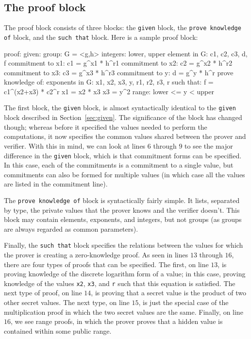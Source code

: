 \documentclass[letterpaper,11pt]{article}
\begin{document}
\subsection{The proof block}\label{sec:proof}

The proof block consists of three blocks: the \verb#given# block, the 
\verb#prove knowledge of# block, and the \verb#such that# block.  Here is a
sample proof block:

\begin{ZKPVerbatim}
proof:
	given: 
		group: G = <g,h>
		integers: lower, upper
		element in G: c1, c2, c3, d, f
			commitment to x1: c1 = g^x1 * h^r1
			commitment to x2: c2 = g^x2 * h^r2
			commitment to x3: c3 = g^x3 * h^r3
			commitment to y: d = g^y * h^r
	prove knowledge of:
		exponents in G: x1, x2, x3, y, r1, r2, r3, r
	such that:
		f = c1^(x2+x3) * c2^r
		x1 = x2 * x3
		x3 = y^2
		range: lower <= y < upper
\end{ZKPVerbatim}  

The first block, the \verb#given# 
block, is almost syntactically identical to the \verb#given# block described in
Section~\ref{sec:given}.  The significance of the block has changed though;
whereas before it specified the values needed to perform the computations, it now
specifies the common values shared between the prover and verifier.  With this
in mind, we can look at lines $6$ through $9$ to see the major difference in
the \verb#given# block, which is that commitment forms can be specified.  In
this case, each of the commitments is a commitment to a single value, but
commitments can also be formed for multiple values (in which case all the
values are listed in the commitment line).

The \verb#prove knowledge of# block is syntactically fairly simple.  It lists,
separated by type, the private values that the prover knows and the verifier
doesn't.  This block may contain elements, exponents, and integers, but not
groups (as groups are always regarded as common parameters).

Finally, the \verb#such that# block specifies the relations between the values
for which the prover is creating a zero-knowledge proof.  As seen in lines
$13$ through $16$, there are four types of proofs that can be specified.  The
first, on line $13$, is proving knowledge of the discrete logarithm form of a
value; in this case, proving knowledge of the values \verb#x2#, \verb#x3#, and
\verb#r# such that this equation is satisfied.  The next type of proof, on
line $14$, is proving that a secret value is the product of two other secret
values.  The next type, on line $15$, is just the special case of the
multiplication proof in which the two secret values are the same.  Finally, on
line $16$, we see range proofs, in which the prover proves that a hidden value
is contained within some public range.
\end{document}
